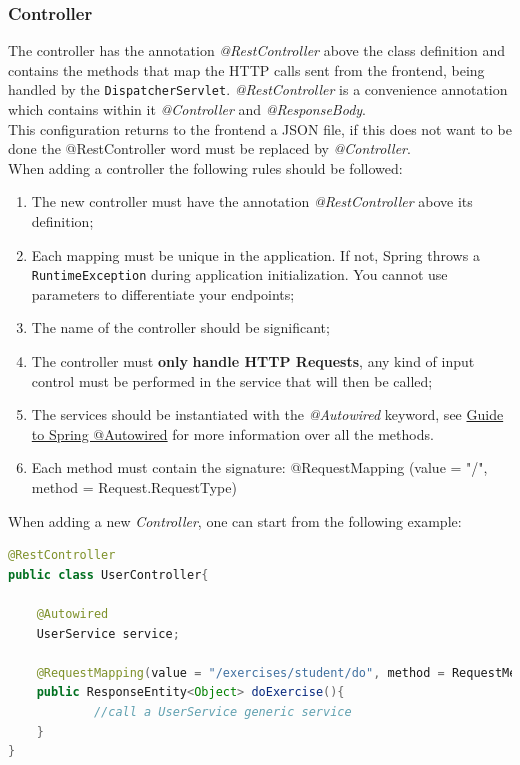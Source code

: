 \subsubsection{Controller}
The controller has the annotation \textit{@RestController} above the class definition and contains the methods that map the HTTP calls sent from the frontend, being handled by the \texttt{DispatcherServlet}. \textit{@RestController} is a convenience annotation which contains within it \textit{@Controller} and \textit{@ResponseBody}.\\
This configuration returns to the frontend a JSON file, if this does not want to be done the @RestController word must be replaced by \textit{@Controller}.\\
When adding a controller the following rules should be followed:
\begin{enumerate}
\item The new controller must have the annotation \textit{@RestController} above its definition;
\item Each mapping must be unique in the application. If not, Spring throws a \texttt{RuntimeException} during application initialization. You cannot use parameters to differentiate your endpoints;
\item The name of the controller should be significant;
\item The controller must \textbf{only} \textbf{handle HTTP Requests}, any kind of input control must be performed in the service that will then be called;
\item The services should be instantiated with the \textit{@Autowired} keyword, see \href{https://www.baeldung.com/spring-autowire}{Guide to Spring @Autowired} for more information over all the methods.
\item Each method must contain the signature: @RequestMapping (value = "/", method = Request.RequestType)
\end{enumerate}
When adding a new \textit{Controller}, one can start from the following example:
\begin{lstlisting}[language=Java]
@RestController
public class UserController{

	@Autowired
	UserService service; 
	
	@RequestMapping(value = "/exercises/student/do", method = RequestMethod.POST, produces = MediaType.APPLICATION_JSON_VALUE)
	public ResponseEntity<Object> doExercise(){
			//call a UserService generic service
	}
}
\end{lstlisting}
